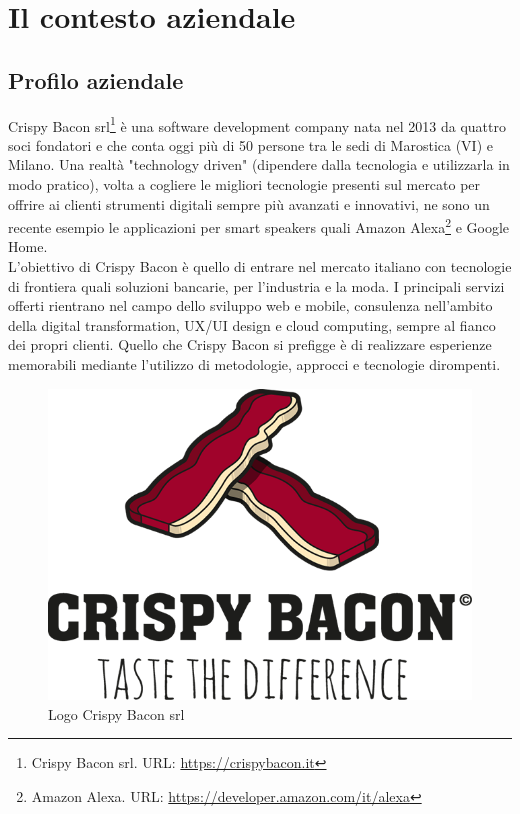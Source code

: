 
\chapter{Il contesto aziendale}
\label{cap:contesto_aziendale}
\section{Profilo aziendale}
Crispy Bacon srl\footnote{Crispy Bacon srl. URL: \href{https://crispybacon.it/}{https://crispybacon.it}} è una software development company nata nel 2013 da quattro soci fondatori e che conta oggi più di 50 persone tra le sedi di Marostica (VI) e Milano. Una realtà "technology driven" (dipendere dalla tecnologia e utilizzarla in modo pratico), volta a cogliere le migliori tecnologie presenti sul mercato per offrire ai clienti strumenti digitali sempre più avanzati e innovativi, ne sono un recente esempio le applicazioni per smart speakers quali Amazon Alexa\footnote{Amazon Alexa. URL: \href{https://developer.amazon.com/it/alexa}{https://developer.amazon.com/it/alexa}} e Google Home.\\
L’obiettivo di Crispy Bacon è quello di entrare nel mercato italiano con tecnologie di frontiera quali soluzioni bancarie, per l'industria e la moda.
I principali servizi offerti rientrano nel campo dello sviluppo web e mobile, consulenza nell'ambito della digital transformation, UX/UI design e cloud computing, sempre al fianco dei propri clienti.
Quello che Crispy Bacon si prefigge è di realizzare esperienze memorabili mediante l’utilizzo di metodologie, approcci e tecnologie dirompenti.
\begin{figure}[H] 
    \centering 
    \includegraphics[width=0.7\columnwidth]{immagini/logo.png}
    \caption{\label{fig:logo_cripsy}Logo Crispy Bacon srl}
\end{figure}
